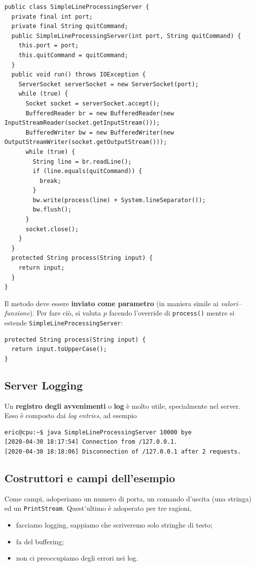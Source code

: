 \documentclass[\fontsizeclass,twocolumn]{\classname}
\theoremstyle{definition}
\theoremstyle{definition}
\begin{document}
\begin{lstlisting}
public class SimpleLineProcessingServer {
  private final int port;
  private final String quitCommand;
  public SimpleLineProcessingServer(int port, String quitCommand) {
    this.port = port;
    this.quitCommand = quitCommand;
  }
  public void run() throws IOException {
    ServerSocket serverSocket = new ServerSocket(port);
    while (true) {
      Socket socket = serverSocket.accept();
      BufferedReader br = new BufferedReader(new InputStreamReader(socket.getInputStream()));
      BufferedWriter bw = new BufferedWriter(new OutputStreamWriter(socket.getOutputStream()));
      while (true) {
        String line = br.readLine();
        if (line.equals(quitCommand)) {          
          break;
        }
        bw.write(process(line) + System.lineSeparator());
        bw.flush();
      }
      socket.close();
    }
  }
  protected String process(String input) {
    return input;
  }
}
\end{lstlisting}

Il metodo deve essere \textbf{inviato come parametro} (in maniera simile ai
\emph{valori--funzione}). Per fare ciò, si valuta $p$ facendo l'override di
\texttt{process()} mentre si estende \texttt{SimpleLineProcessingServer}:

\begin{lstlisting}
protected String process(String input) {
  return input.toUpperCase();
}
\end{lstlisting}

\subsection{Server Logging}

Un \textbf{registro degli avvenimenti} o \textbf{log} è molto utile,
specialmente nel server. Esso è composto dai \emph{log entries}, ad esempio

\begin{lstlisting}
eric@cpu:~$ java SimpleLineProcessingServer 10000 bye
[2020-04-30 18:17:54] Connection from /127.0.0.1.
[2020-04-30 18:18:06] Disconnection of /127.0.0.1 after 2 requests.
\end{lstlisting}

\subsection{Costruttori e campi dell'esempio}

Come campi, adoperiamo un numero di porta, un comando d'uscita (una stringa) ed
un \texttt{PrintStream}. Quest'ultimo è adoperato per tre ragioni,
\begin{itemize}
    \item facciamo logging, sappiamo che scriveremo solo stringhe di testo;
    \item fa del buffering;
    \item non ci preoccupiamo degli errori nei log.
\end{itemize}
\end{document}
